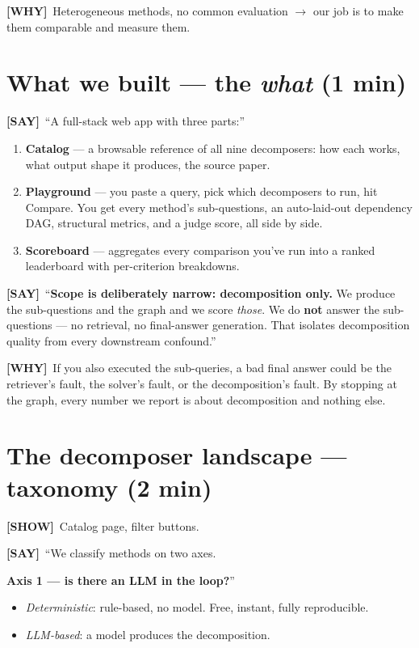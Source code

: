 \documentclass[11pt]{article}
\newcommand{\say}{\textcolor{sayc}{\textbf{[SAY]}}\ }
\newcommand{\showcue}{\textcolor{showc}{\textbf{[SHOW]}}\ }
\newcommand{\why}{\textcolor{whyc}{\textbf{[WHY]}}\ }
\begin{document}
\why Heterogeneous methods, no common evaluation $\rightarrow$ our job is to make
them comparable and measure them.

\section{What we built --- the \emph{what} (1 min)}

\say ``A full-stack web app with three parts:''
\begin{enumerate}[leftmargin=1.6em,itemsep=2pt]
  \item \textbf{Catalog} --- a browsable reference of all nine decomposers: how
  each works, what output shape it produces, the source paper.
  \item \textbf{Playground} --- you paste a query, pick which decomposers to run,
  hit Compare. You get every method's sub-questions, an auto-laid-out dependency
  DAG, structural metrics, and a judge score, all side by side.
  \item \textbf{Scoreboard} --- aggregates every comparison you've run into a
  ranked leaderboard with per-criterion breakdowns.
\end{enumerate}

\say ``\textbf{Scope is deliberately narrow: decomposition only.} We produce the
sub-questions and the graph and we score \emph{those}. We do \textbf{not} answer
the sub-questions --- no retrieval, no final-answer generation. That isolates
decomposition quality from every downstream confound.''

\why If you also executed the sub-queries, a bad final answer could be the
retriever's fault, the solver's fault, or the decomposition's fault. By stopping
at the graph, every number we report is about decomposition and nothing else.

\section{The decomposer landscape --- taxonomy (2 min)}

\showcue Catalog page, filter buttons.

\say ``We classify methods on two axes.

\textbf{Axis 1 --- is there an LLM in the loop?}''
\begin{itemize}
  \item \emph{Deterministic}: rule-based, no model. Free, instant, fully
  reproducible.
  \item \emph{LLM-based}: a model produces the decomposition.
\end{itemize}
\end{document}
